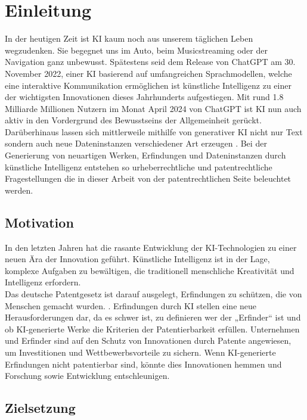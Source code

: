 \chapter{Einleitung \label{cha:chapter1}}

In der heutigen Zeit ist \gls{KI} kaum 
noch aus unserem täglichen Leben wegzudenken. 
Sie begegnet uns im Auto, beim Musicstreaming oder der Navigation ganz unbewusst. 
Spätestens seid dem Release von ChatGPT am 30. November 2022, 
einer KI basierend auf umfangreichen Sprachmodellen, 
welche eine interaktive Kommunikation ermöglichen 
\cite{ChatGPT} ist künstliche Intelligenz zu einer 
der wichtigsten Innovationen dieses Jahrhunderts aufgestiegen. 
Mit rund 1.8 Milliarde Millionen Nutzern im Monat April 2024 
\cite{NumberChatGPTUsers2023} 
von ChatGPT ist KI nun auch aktiv in den Vordergrund des Bewusstseins 
der Allgemeinheit gerückt. 
Darüberhinaus lassen sich mittlerweile mithilfe von generativer KI 
nicht nur Text sondern auch neue 
Dateninstanzen verschiedener Art erzeugen \cite{WasIstKuenstliche}. 
Bei der Generierung von neuartigen Werken, 
Erfindungen und Dateninstanzen durch künstliche Intelligenz entstehen so 
urheberrechtliche und 
patentrechtliche Fragestellungen die in dieser Arbeit von der 
patentrechtlichen Seite beleuchtet werden.

\section{Motivation\label{sec:moti}}

In den letzten Jahren hat die rasante Entwicklung 
der KI-Technologien zu einer neuen Ära der Innovation geführt. 
Künstliche Intelligenz ist in der Lage, komplexe Aufgaben zu bewältigen, 
die traditionell menschliche Kreativität und Intelligenz erfordern. 
\\

Das deutsche Patentgesetz ist darauf ausgelegt, 
Erfindungen zu schützen, die von Menschen gemacht wurden. 
\cite{DPMAPatentschutz}. 
Erfindungen durch KI stellen eine neue Herausforderungen dar, 
da es schwer ist, zu definieren wer der „Erfinder“ ist und ob 
KI-generierte Werke die Kriterien der Patentierbarkeit erfüllen. 
Unternehmen und Erfinder sind auf den Schutz von Innovationen durch 
Patente angewiesen, um Investitionen und Wettbewerbsvorteile zu sichern. 
Wenn KI-generierte Erfindungen nicht patentierbar sind, 
könnte dies Innovationen hemmen und Forschung sowie Entwicklung entschleunigen. 


\section{Zielsetzung\label{sec:objective}}

